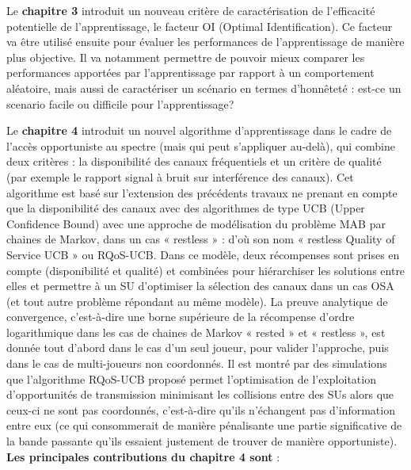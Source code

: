Le \textbf{chapitre 3} introduit un nouveau critère de caractérisation de l’efficacité potentielle de l’apprentissage, le facteur OI (Optimal Identification). Ce facteur va être utilisé ensuite pour évaluer les performances de l’apprentissage de manière plus objective. Il va notamment permettre de pouvoir mieux comparer les performances apportées par l’apprentissage par rapport à un comportement aléatoire, mais aussi de caractériser un scénario en termes d’honnêteté : est-ce un scenario facile ou difficile pour l'apprentissage?

Le \textbf{chapitre 4} introduit un nouvel algorithme d’apprentissage dans le cadre de l’accès opportuniste au spectre (mais qui peut s’appliquer au-delà), qui combine deux critères : la disponibilité des canaux fréquentiels et un critère de qualité (par exemple le rapport signal à bruit sur interférence des canaux). Cet algorithme est basé sur l’extension des précédents travaux ne prenant en compte que la disponibilité des canaux avec des algorithmes de type UCB (Upper Confidence Bound) \cite{Wassim_2010} avec une approche de modélisation du problème MAB par chaines de Markov, dans un cas « restless » : d’où son nom « restless Quality of Service UCB » ou RQoS-UCB. Dans ce modèle, deux récompenses sont prises en compte (disponibilité et qualité) et combinées pour hiérarchiser les solutions entre elles et permettre à un SU d’optimiser la sélection des canaux dans un cas OSA (et tout autre problème répondant au même modèle). La preuve analytique de convergence, c’est-à-dire une borne supérieure de la récompense d’ordre logarithmique dans les cas de chaines de Markov « rested » et « restless », est donnée tout d’abord dans le cas d’un seul joueur, pour valider l’approche, puis dans le cas de multi-joueurs non coordonnés. Il est montré par des simulations que l’algorithme RQoS-UCB proposé permet l’optimisation de l’exploitation d’opportunités de transmission minimisant les collisions entre des SUs alors que ceux-ci ne sont pas coordonnés, c’est-à-dire qu’ils n’échangent pas d’information entre eux (ce qui consommerait de manière pénalisante une partie significative de la bande passante qu’ils essaient justement de trouver de manière opportuniste). \textbf{Les principales contributions du chapitre 4 sont} :
